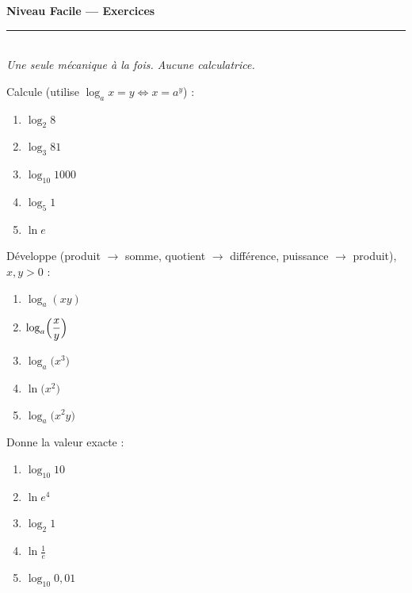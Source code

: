 \documentclass[11pt,a4paper]{article}
\newcommand{\ds}{\displaystyle}
\begin{document}
\begin{center}
{\LARGE\bfseries\color{primarydark} Niveau Facile — Exercices}\\[2pt]
{\color{primary}\rule{0.45\textwidth}{1.2pt}}\\[3pt]
{\small\itshape Une seule mécanique à la fois. Aucune calculatrice.}
\end{center}
\vspace{1mm}

\begin{exo}
Calcule (utilise $\log_a x=y\iff x=a^{y}$) :
\begin{enumerate}[label=\alph*),leftmargin=2em,topsep=1pt,itemsep=1pt]
  \item $\log_2 8$ \qquad
  \item $\log_3 81$ \qquad
  \item $\log_{10} 1000$ \qquad
  \item $\log_5 1$ \qquad
  \item $\ln e$
\end{enumerate}
\end{exo}

\begin{exo}
Développe (produit $\to$ somme, quotient $\to$ différence, puissance $\to$ produit), $x,y>0$ :
\begin{enumerate}[label=\alph*),leftmargin=2em,topsep=1pt,itemsep=1pt]
  \item $\log_a(xy)$ \qquad
  \item $\ds\log_a\Bigl(\frac{x}{y}\Bigr)$ \qquad
  \item $\log_a\bigl(x^{3}\bigr)$ \qquad
  \item $\ln\bigl(x^{2}\bigr)$ \qquad
  \item $\log_a\bigl(x^{2}y\bigr)$
\end{enumerate}
\end{exo}

\begin{exo}
Donne la valeur exacte :
\begin{enumerate}[label=\alph*),leftmargin=2em,topsep=1pt,itemsep=1pt]
  \item $\log_{10} 10$ \qquad
  \item $\ln e^{4}$ \qquad
  \item $\log_2 1$ \qquad
  \item $\ds\ln\frac{1}{e}$ \qquad
  \item $\log_{10} 0{,}01$
\end{enumerate}
\end{exo}
\end{document}
